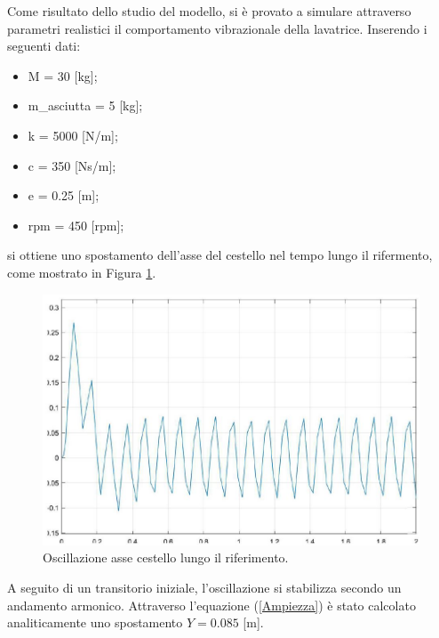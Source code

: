 Come risultato dello studio del modello, si è provato a simulare attraverso parametri realistici il comportamento vibrazionale della lavatrice. Inserendo i seguenti dati:
\begin{itemize}
    \item M = 30 [kg];
    \item m\_asciutta = 5 [kg];
    \item k = 5000 [N/m];
    \item c = 350 [Ns/m];
    \item e = 0.25 [m];
    \item rpm = 450 [rpm];
\end{itemize}
si ottiene uno spostamento dell'asse del cestello nel tempo lungo il rifermento, come mostrato in Figura \ref{PrimoPlot}. 
\begin{figure}[h]
    \centering
    \includegraphics[scale=0.5]{Immagini/PrimoPlot.JPG}
    \caption{Oscillazione asse cestello lungo il riferimento.}
    \label{PrimoPlot}
\end{figure}
A seguito di un transitorio iniziale, l'oscillazione si stabilizza secondo un andamento armonico.
Attraverso l'equazione (\ref{Ampiezza}) è stato calcolato analiticamente uno spostamento $Y=0.085$ [m].

